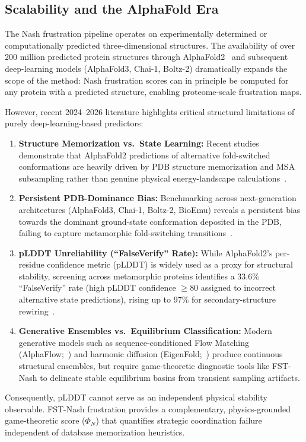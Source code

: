 \documentclass[12pt,a4paper]{article}
\theoremstyle{remark}
\begin{document}
\subsection{Scalability and the AlphaFold Era}

The Nash frustration pipeline operates on experimentally determined or computationally predicted three-dimensional structures. The availability of over 200 million predicted protein structures through AlphaFold2~\citep{JumperAF2021} and subsequent deep-learning models (AlphaFold3, Chai-1, Boltz-2) dramatically expands the scope of the method: Nash frustration scores can in principle be computed for any protein with a predicted structure, enabling proteome-scale frustration maps.

However, recent 2024--2026 literature highlights critical structural limitations of purely deep-learning-based predictors:
\begin{enumerate}
    \item \textbf{Structure Memorization vs.\ State Learning:} Recent studies demonstrate that AlphaFold2 predictions of alternative fold-switched conformations are heavily driven by PDB structure memorization and MSA subsampling rather than genuine physical energy-landscape calculations~\citep{NatureComms2024}.
    \item \textbf{Persistent PDB-Dominance Bias:} Benchmarking across next-generation architectures (AlphaFold3, Chai-1, Boltz-2, BioEmu) reveals a persistent bias towards the dominant ground-state conformation deposited in the PDB, failing to capture metamorphic fold-switching transitions~\citep{Ye2026}.
    \item \textbf{pLDDT Unreliability (``FalseVerify'' Rate):} While AlphaFold2's per-residue confidence metric (pLDDT) is widely used as a proxy for structural stability, screening across metamorphic proteins identifies a 33.6\% ``FalseVerify'' rate (high pLDDT confidence $\ge 80$ assigned to incorrect alternative state predictions), rising up to 97\% for secondary-structure rewiring~\citep{Thacker2026}.
    \item \textbf{Generative Ensembles vs.\ Equilibrium Classification:} Modern generative models such as sequence-conditioned Flow Matching (AlphaFlow;~\citealp{JingFlow2024}) and harmonic diffusion (EigenFold;~\citealp{JingDiffusion2023}) produce continuous structural ensembles, but require game-theoretic diagnostic tools like FST-Nash to delineate stable equilibrium basins from transient sampling artifacts.
\end{enumerate}
Consequently, pLDDT cannot serve as an independent physical stability observable. FST-Nash frustration provides a complementary, physics-grounded game-theoretic score ($\Phi_N$) that quantifies strategic coordination failure independent of database memorization heuristics.
\end{document}
